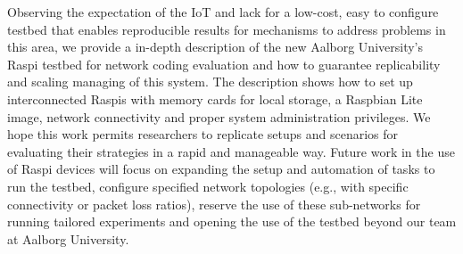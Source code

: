 \label{sec:conclusions}
Observing the expectation of the \ac{IoT} and lack for a low-cost, easy to configure testbed that enables reproducible results for mechanisms to address problems in this area, we provide a in-depth description of the new Aalborg University's \ac{Raspi} testbed for network coding evaluation and how to guarantee replicability and scaling managing of this system. The description shows how to set up interconnected \ac{Raspi}s with memory cards for local storage, a Raspbian Lite image, network connectivity and proper system administration privileges. We hope this work permits researchers to replicate setups and scenarios for evaluating their strategies in a rapid and manageable way. Future work in the use of \ac{Raspi} devices will focus on expanding the setup and automation of tasks to run the testbed, configure specified network topologies (e.g., with specific connectivity or packet loss ratios), reserve the use of these sub-networks for running tailored experiments and opening the use of the testbed beyond our team at Aalborg University.
